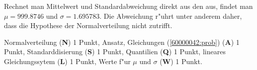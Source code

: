 \begin{diskussion}
Rechnet man Mittelwert und Standardabweichung direkt aus den aus, findet man
$\mu=999.8746$ und $\sigma=1.695783$.
Die Abweichung r"uhrt unter anderem daher, dass die Hypothese der
Normalverteilung nicht zutrifft.
\end{diskussion}

\begin{bewertung}
Normalverteilung ({\bf N}) 1 Punkt,
Ansatz, Gleichungen (\ref{60000042:prob}) ({\bf A}) 1 Punkt,
Standarddisierung ({\bf S}) 1 Punkt,
Quantilien ({\bf Q}) 1 Punkt,
lineares Gleichungssytem ({\bf L}) 1 Punkt,
Werte f"ur $\mu$ und $\sigma$ ({\bf W}) 1 Punkt.
\end{bewertung}

